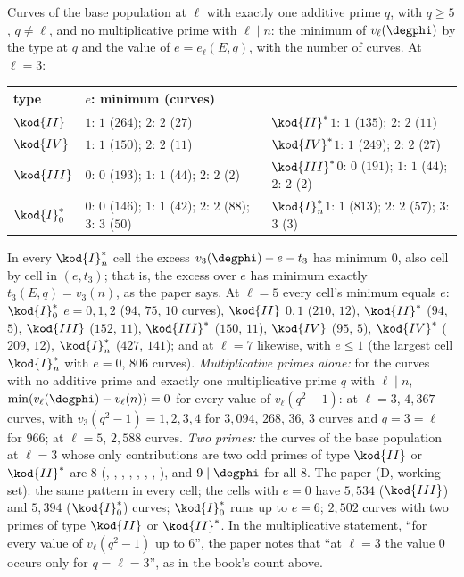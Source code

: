 \begin{sloppypar}
\begin{example}\label{ex:computation:repro-iso}
Curves of the base population at $\ell$ with exactly one additive prime $q$, with $q\ge5$, $q\ne\ell$, and no multiplicative prime with $\ell\mid n$: the minimum of
$v_\ell(\degphi)$ by the type at $q$ and the value of $e=e_\ell(E,q)$, with the number of curves. At $\ell=3$:
\begin{center}\footnotesize
\begin{tabular}{lll}
\toprule
type & $e$: minimum (curves) & \\
\midrule
$\kod{II}$ & $1$: $1$ ($264$); $2$: $2$ ($27$) & $\kod{II}^*$\quad $1$: $1$ ($135$); $2$: $2$ ($11$)\\
$\kod{IV}$ & $1$: $1$ ($150$); $2$: $2$ ($11$) & $\kod{IV}^*$\quad $1$: $1$ ($249$); $2$: $2$ ($27$)\\
$\kod{III}$ & $0$: $0$ ($193$); $1$: $1$ ($44$); $2$: $2$ ($2$) & $\kod{III}^*$\quad $0$: $0$ ($191$); $1$: $1$ ($44$); $2$: $2$ ($2$)\\
$\kod{I}_0^*$ & $0$: $0$ ($146$); $1$: $1$ ($42$); $2$: $2$ ($88$); $3$: $3$ ($50$) & $\kod{I}_n^*$\quad $1$: $1$ ($813$); $2$: $2$ ($57$); $3$: $3$ ($3$)\\
\bottomrule
\end{tabular}
\end{center}
In every $\kod{I}_n^*$ cell the excess $v_3(\degphi)-e-t_3$ has minimum $0$, also cell by cell in $(e,t_3)$; that is, the excess over $e$ has minimum exactly
$t_3(E,q)=v_3(n)$, as the paper says. At $\ell=5$ every cell's minimum equals $e$: $\kod{I}_0^*$ $e=0,1,2$ ($94$, $75$, $10$ curves), $\kod{II}$ $0,1$ ($210$, $12$), $\kod{II}^*$ ($94$,
$5$), $\kod{III}$ ($152$, $11$), $\kod{III}^*$ ($150$, $11$), $\kod{IV}$ ($95$, $5$), $\kod{IV}^*$ ($209$, $12$), $\kod{I}_n^*$ ($427$, $141$); and at $\ell=7$ likewise, with $e\le1$ (the largest
cell $\kod{I}_n^*$ with $e=0$, $806$ curves). \emph{Multiplicative primes alone:} for the curves with no additive prime and exactly one multiplicative prime $q$ with
$\ell\mid n$, $\min(v_\ell(\degphi)-v_\ell(n))=0$ for every value of $v_\ell(q^2-1)$: at $\ell=3$, $4{,}367$ curves, with $v_3(q^2-1)=1,2,3,4$ for $3{,}094$, $268$, $36$, $3$
curves and $q=3=\ell$ for $966$; at $\ell=5$, $2{,}588$ curves. \emph{Two primes:} the curves of the base population at $\ell=3$ whose only contributions are two odd
primes of type $\kod{II}$ or $\kod{II}^*$ are $8$ (, , , , , , , ), and
$9\mid\degphi$ for all $8$. The paper (D, working set): the same pattern in every cell; the cells with $e=0$ have $5{,}534$ ($\kod{III}$) and $5{,}394$ ($\kod{I}_0^*$)
curves; $\kod{I}_0^*$ runs up to $e=6$; $2{,}502$ curves with two primes of type $\kod{II}$ or $\kod{II}^*$. In the multiplicative statement, ``for every value of
$v_\ell(q^2-1)$ up to $6$'', the paper notes that ``at $\ell=3$ the value $0$ occurs only for $q=\ell=3$'', as in the book's count above.
\end{example}


\end{sloppypar}
